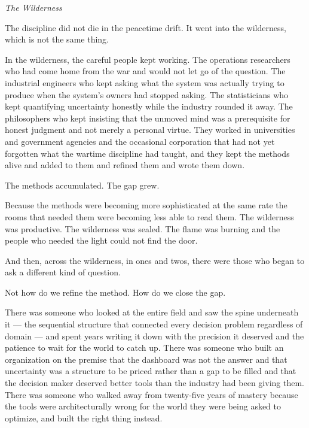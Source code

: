 \vspace{1.5em}
\begin{center}
  \small\itshape The Wilderness
\end{center}
\vspace{1.5em}

The discipline did not die in the peacetime drift. It went into the wilderness, which is not the same thing.

In the wilderness, the careful people kept working. The operations researchers who had come home from the war and would not let go of the question. The industrial engineers who kept asking what the system was actually trying to produce when the system's owners had stopped asking. The statisticians who kept quantifying uncertainty honestly while the industry rounded it away. The philosophers who kept insisting that the unmoved mind was a prerequisite for honest judgment and not merely a personal virtue. They worked in universities and government agencies and the occasional corporation that had not yet forgotten what the wartime discipline had taught, and they kept the methods alive and added to them and refined them and wrote them down.

The methods accumulated. The gap grew.

Because the methods were becoming more sophisticated at the same rate the rooms that needed them were becoming less able to read them. The wilderness was productive. The wilderness was sealed. The flame was burning and the people who needed the light could not find the door.

And then, across the wilderness, in ones and twos, there were those who began to ask a different kind of question.

Not how do we refine the method. How do we close the gap.

There was someone who looked at the entire field and saw the spine underneath it --- the sequential structure that connected every decision problem regardless of domain --- and spent years writing it down with the precision it deserved and the patience to wait for the world to catch up. There was someone who built an organization on the premise that the dashboard was not the answer and that uncertainty was a structure to be priced rather than a gap to be filled and that the decision maker deserved better tools than the industry had been giving them. There was someone who walked away from twenty-five years of mastery because the tools were architecturally wrong for the world they were being asked to optimize, and built the right thing instead.

